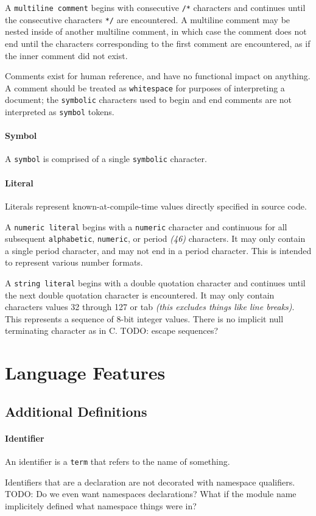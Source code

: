 \documentclass{article}
\newcommand{\code}[1]{\colorbox{light-gray}{\texttt{#1}}}
\newcommand{\breakingparagraph}[1]{\paragraph{#1}\mbox{}\medbreak}
\begin{document}
A \code{multiline comment} begins with consecutive \code{/*} characters and continues until the consecutive characters \code{*/} are encountered.  A multiline comment may be nested inside of another multiline comment, in which case the comment does not end until the characters corresponding to the first comment are encountered, as if the inner comment did not exist.

Comments exist for human reference, and have no functional impact on anything.  A comment should be treated as \code{whitespace} for purposes of interpreting a document; the \code{symbolic} characters used to begin and end comments are not interpreted as \code{symbol} tokens.

\breakingparagraph{Symbol}
A \code{symbol} is comprised of a single \code{symbolic} character.

\breakingparagraph{Literal}
Literals represent known-at-compile-time values directly specified in source code.

A \code{numeric literal} begins with a \code{numeric} character and continuous for all subsequent \code{alphabetic}, \code{numeric}, or period \textit{(46)} characters.  It may only contain a single period character, and may not end in a period character.  This is intended to represent various number formats.

A \code{string literal} begins with a double quotation character and continues until the next double quotation character is encountered.  It may only contain characters values 32 through 127 or tab \textit{(this excludes things like line breaks)}.  This represents a sequence of 8-bit integer values.  There is no implicit null terminating character as in C.  TODO: escape sequences?

\newpage


\section{Language Features}

\subsection{Additional Definitions}
\breakingparagraph{Identifier}
An identifier is a \code{term} that refers to the name of something.

Identifiers that are a declaration are not decorated with namespace qualifiers.  TODO: Do we even want namespaces declarations?  What if the module name implicitely defined what namespace things were in?
\end{document}

